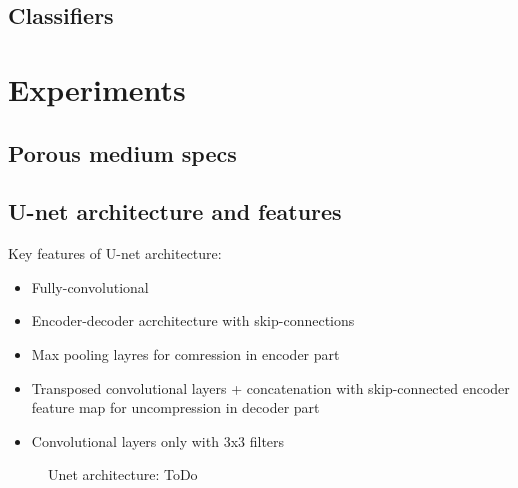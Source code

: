 \documentclass[review]{elsarticle}
\begin{document}
\subsection{Classifiers}

\section{Experiments}

\subsection{Porous medium specs}

\subsection{U-net architecture and features}

Key features of U-net architecture:
\begin{itemize}
	\item Fully-convolutional 
	\item Encoder-decoder acrchitecture with skip-connections
	\item Max pooling layres for comression in encoder part
	\item Transposed convolutional layers + concatenation with skip-connected encoder feature map for uncompression in decoder part
	\item Convolutional layers only with 3x3 filters
\end{itemize}

\begin{figure}[h]
	\caption{Unet architecture: ToDo}
	\label{Unet:architecture}
\end{figure}
\end{document}
